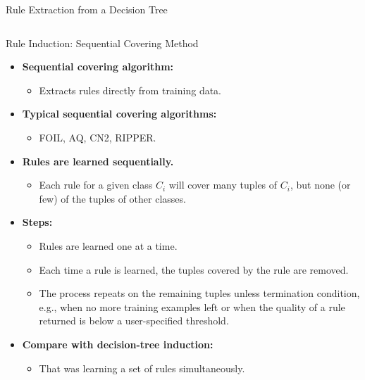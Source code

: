 \begin{frame}{Rule Extraction from a Decision Tree}
\begin{columns}
\begin{column}{0.55\textwidth}
    \end{column}
  \end{columns}
\end{frame}

\begin{frame}{Rule Induction: Sequential Covering Method}
  \begin{itemize}
  \item \textbf{Sequential covering algorithm:}
    \begin{itemize}
    \item Extracts rules directly from training data.
    \end{itemize}
  \item \textbf{Typical sequential covering algorithms:}
    \begin{itemize}
    \item FOIL, AQ, CN2, RIPPER.
    \end{itemize}
  \item \textbf{Rules are learned {\color{airforceblue}sequentially}.}
    \begin{itemize}
    \item Each rule for a given class $C_i$ will cover many tuples of $C_i$, but none (or few) of the tuples of other classes.
    \end{itemize}
  \item \textbf{Steps:}
    \begin{itemize}
    \item Rules are learned one at a time.
    \item Each time a rule is learned, the tuples covered by the rule are removed.
    \item The process repeats on the remaining tuples unless termination condition, e.g., when no more training examples left or when the quality of a rule returned is below a user-specified threshold.
    \end{itemize}
  \item \textbf{Compare with decision-tree induction:}
    \begin{itemize}
    \item That was learning a set of rules simultaneously.
    \end{itemize}
  \end{itemize}
\end{frame}

